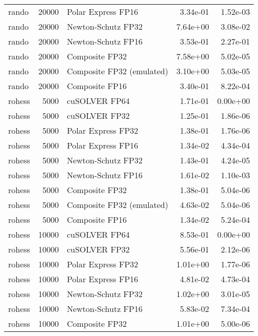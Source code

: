 \begin{table}
\begin{tabular}{lrlrr}
    rando & 20000 &        Polar Express FP16 &  3.34e-01 &        1.52e-03 \\
    rando & 20000 &        Newton-Schutz FP32 &  7.64e+00 &        3.08e-02 \\
    rando & 20000 &        Newton-Schutz FP16 &  3.53e-01 &        2.27e-01 \\
    rando & 20000 &            Composite FP32 &  7.58e+00 &        5.02e-05 \\
    rando & 20000 & Composite FP32 (emulated) &  3.10e+00 &        5.03e-05 \\
    rando & 20000 &            Composite FP16 &  3.40e-01 &        8.22e-04 \\
   rohess &  5000 &             cuSOLVER FP64 &  1.71e-01 &        0.00e+00 \\
   rohess &  5000 &             cuSOLVER FP32 &  1.25e-01 &        1.86e-06 \\
   rohess &  5000 &        Polar Express FP32 &  1.38e-01 &        1.76e-06 \\
   rohess &  5000 &        Polar Express FP16 &  1.34e-02 &        4.34e-04 \\
   rohess &  5000 &        Newton-Schutz FP32 &  1.43e-01 &        4.24e-05 \\
   rohess &  5000 &        Newton-Schutz FP16 &  1.61e-02 &        1.10e-03 \\
   rohess &  5000 &            Composite FP32 &  1.38e-01 &        5.04e-06 \\
   rohess &  5000 & Composite FP32 (emulated) &  4.63e-02 &        5.04e-06 \\
   rohess &  5000 &            Composite FP16 &  1.34e-02 &        5.24e-04 \\
   rohess & 10000 &             cuSOLVER FP64 &  8.53e-01 &        0.00e+00 \\
   rohess & 10000 &             cuSOLVER FP32 &  5.56e-01 &        2.12e-06 \\
   rohess & 10000 &        Polar Express FP32 &  1.01e+00 &        1.77e-06 \\
   rohess & 10000 &        Polar Express FP16 &  4.81e-02 &        4.73e-04 \\
   rohess & 10000 &        Newton-Schutz FP32 &  1.02e+00 &        3.01e-05 \\
   rohess & 10000 &        Newton-Schutz FP16 &  5.83e-02 &        7.34e-04 \\
   rohess & 10000 &            Composite FP32 &  1.01e+00 &        5.00e-06 \\

\end{tabular}
\end{table}
